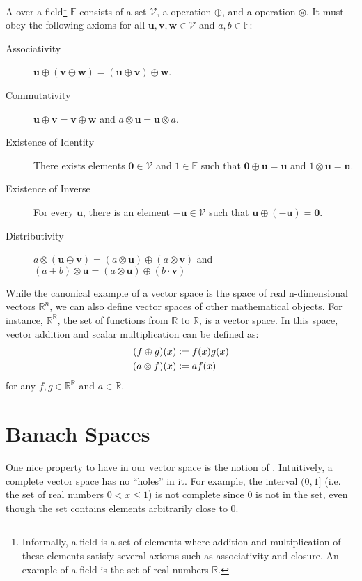 \begin{definition}
A  over a field\footnote{Informally, a field is a set of elements where addition and multiplication of these elements satisfy several axioms such as associativity and closure. An example of a field is the set of real numbers $\mathbb{R}$.} $\mathbb{F}$ consists of a set $\mathcal{V}$, a  operation $\oplus$, and a  operation $\otimes$. It must obey the following axioms for all $\mathbf{u}, \mathbf{v}, \mathbf{w} \in \mathcal{V}$ and $a, b \in \mathbb{F}$:
%
\begin{description}
  \item[Associativity] $\mathbf{u} \oplus (\mathbf{v} \oplus \mathbf{w}) = (\mathbf{u} \oplus \mathbf{v}) \oplus \mathbf{w}$.
  \item[Commutativity] $\mathbf{u} \oplus \mathbf{v} = \mathbf{v} \oplus \mathbf{w}$ and $a \otimes \mathbf{u} = \mathbf{u} \otimes a$.
  \item[Existence of Identity] There exists elements $\mathbf{0} \in \mathcal{V}$ and $1 \in \mathbb{F}$ such that $\mathbf{0} \oplus \mathbf{u} = \mathbf{u}$ and $1 \otimes \mathbf{u} = \mathbf{u}$.
  \item[Existence of Inverse] For every $\mathbf{u}$, there is an element $-\mathbf{u} \in \mathcal{V}$ such that $\mathbf{u} \oplus (-\mathbf{u}) = \mathbf{0}$.
  \item[Distributivity] $a \otimes (\mathbf{u} \oplus \mathbf{v}) = (a \otimes \mathbf{u}) \oplus (a \otimes \mathbf{v})$ and $(a + b) \otimes \mathbf{u} = (a \otimes \mathbf{u}) \oplus (b \cdot \mathbf{v})$
\end{description}
\end{definition}
%
While the canonical example of a vector space is the space of real n-dimensional vectors $\mathbb{R}^n$, we can also define vector spaces of other mathematical objects. For instance, $\mathbb{R}^\mathbb{R}$, the set of functions from $\mathbb{R}$ to $\mathbb{R}$, is a vector space. In this space, vector addition and scalar multiplication can be defined as:
%
\begin{align}
  (f \oplus g)(x) &\vcentcolon= f(x) g(x) \\
  (a \otimes f)(x) &\vcentcolon= a f(x)
\end{align}
%
for any $f, g \in \mathbb{R}^\mathbb{R}$ and $a \in \mathbb{R}$.

\section{Banach Spaces}
One nice property to have in our vector space is the notion of . Intuitively, a complete vector space has no ``holes'' in it. For example, the interval $(0, 1]$ (i.e. the set of real numbers $0 < x \leq 1$) is not complete since $0$ is not in the set, even though the set contains elements arbitrarily close to $0$.

